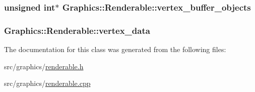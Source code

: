 \subsubsection[{vertex\+\_\+buffer\+\_\+objects}]{\setlength{\rightskip}{0pt plus 5cm}unsigned int$\ast$ Graphics\+::\+Renderable\+::vertex\+\_\+buffer\+\_\+objects\hspace{0.3cm}{\ttfamily [private]}}\label{class_graphics_1_1_renderable_acc80598476e4560582f3bbd4a67b52df}
\hypertarget{class_graphics_1_1_renderable_a5077fe6a71021f0bd4ebc8d24cdf544b}{}
\subsubsection[{vertex\+\_\+data}]{ Graphics\+::\+Renderable\+::vertex\+\_\+data\hspace{0.3cm}{\ttfamily [private]}}\label{class_graphics_1_1_renderable_a5077fe6a71021f0bd4ebc8d24cdf544b}


The documentation for this class was generated from the following files\+:\begin{DoxyCompactItemize}
\item 
src/graphics/\hyperlink{renderable_8h}{renderable.\+h}\item 
src/graphics/\hyperlink{renderable_8cpp}{renderable.\+cpp}\end{DoxyCompactItemize}
